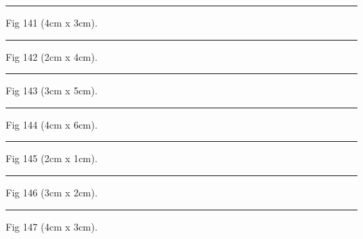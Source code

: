 \documentclass[a4paper,11pt]{article}
\begin{document}
\begin{swarmwrap}%
  \begin{minipage}[t]{4cm}
    \centering
    \rule{\linewidth}{3cm}
    {\footnotesize Fig 141 (4cm x 3cm).}
  \end{minipage}%
\end{swarmwrap}%
\swarmwrapnext
\lipsum[141]%

\begin{swarmwrap}%
  \begin{minipage}[t]{2cm}
    \centering
    \rule{\linewidth}{4cm}
    {\footnotesize Fig 142 (2cm x 4cm).}
  \end{minipage}%
\end{swarmwrap}%
\swarmwrapnext
\lipsum[142]%

\begin{swarmwrap}%
  \begin{minipage}[t]{3cm}
    \centering
    \rule{\linewidth}{5cm}
    {\footnotesize Fig 143 (3cm x 5cm).}
  \end{minipage}%
\end{swarmwrap}%
\swarmwrapnext
\lipsum[143]%

\begin{swarmwrap}%
  \begin{minipage}[t]{4cm}
    \centering
    \rule{\linewidth}{6cm}
    {\footnotesize Fig 144 (4cm x 6cm).}
  \end{minipage}%
\end{swarmwrap}%
\swarmwrapnext
\lipsum[144]%

\begin{swarmwrap}%
  \begin{minipage}[t]{2cm}
    \centering
    \rule{\linewidth}{1cm}
    {\footnotesize Fig 145 (2cm x 1cm).}
  \end{minipage}%
\end{swarmwrap}%
\swarmwrapnext
\lipsum[145]%

\begin{swarmwrap}%
  \begin{minipage}[t]{3cm}
    \centering
    \rule{\linewidth}{2cm}
    {\footnotesize Fig 146 (3cm x 2cm).}
  \end{minipage}%
\end{swarmwrap}%
\swarmwrapnext
\lipsum[146]%

\begin{swarmwrap}%
  \begin{minipage}[t]{4cm}
    \centering
    \rule{\linewidth}{3cm}
    {\footnotesize Fig 147 (4cm x 3cm).}
  \end{minipage}%
\end{swarmwrap}%
\swarmwrapnext
\lipsum[147]%
\end{document}
